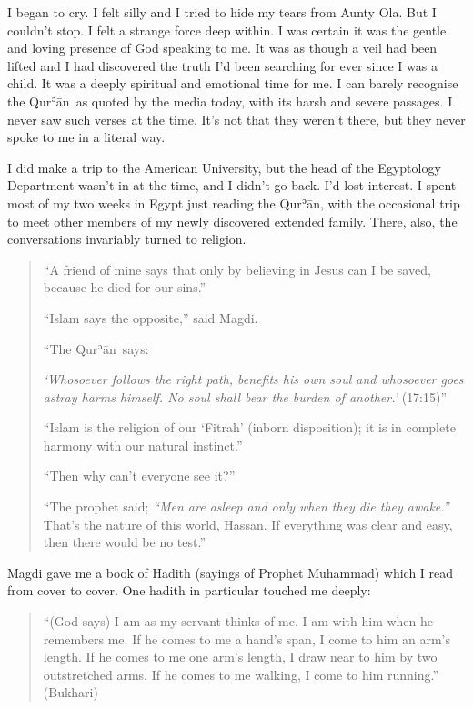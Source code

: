\documentclass[12pt]{memoir}
\def\´{ʾ} %
\def \Quran{Qur\-\´ān} %
\newcommand{\QRef}[1]{{\color{darkblue}#1}}
\begin{document}
I began to cry.
I felt silly and I tried to hide my tears from Aunty Ola.
But I couldn’t stop.
I felt a strange force deep within.
I was certain it was the gentle and loving presence of God speaking to me.
It was as though a veil had been lifted and I had discovered the truth
I’d been searching for ever since I was a child.
It was a deeply spiritual and emotional time for me.
I can barely recognise the \Quran\ as quoted by the media today,
with its harsh and severe passages.
I never saw such verses at the time.
It’s not that they weren’t there,
but they never spoke to me in a literal way.

I did make a trip to the American University,
but the head of the Egyptology Department wasn’t in at the time,
and I didn’t go back.
I’d lost interest.
I spent most of my two weeks in Egypt just reading the \Quran,
with the occasional trip to meet other members
of my newly discovered extended family.
There, also, the conversations invariably turned to religion.

\begin{quote}
“A friend of mine says that only by believing in Jesus can I be saved,
because he died for our sins.”

“Islam says the opposite,” said Magdi.

“The \Quran\ says:

\emph{‘Whosoever follows the right path, benefits his own soul
and whosoever goes astray harms himself.
No soul shall bear the burden of another.’}
(\QRef{17:15})”

“Islam is the religion of our ‘Fitrah’ (inborn disposition);
it is in complete harmony with our natural instinct.”

“Then why can’t everyone see it?”

“The prophet said;
\emph{“Men are asleep and only when they die they awake.”}
That’s the nature of this world, Hassan.
If everything was clear and easy, then there would be no test.”
\end{quote}

Magdi gave me a book of Hadith (sayings of Prophet Muhammad)
which I read from cover to cover.
One hadith in particular touched me deeply:

\begin{quote}
“(God says) I am as my servant thinks of me.
I am with him when he remembers me.
If he comes to me a hand’s span, I come to him an arm’s length.
If he comes to me one arm’s length,
I draw near to him by two outstretched arms.
If he comes to me walking, I come to him running.” (Bukhari)
\end{quote}
\end{document}
